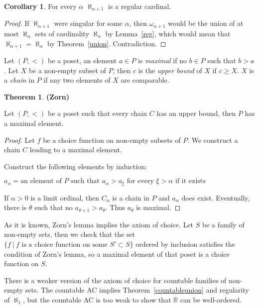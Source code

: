 \documentclass[8pt]{article}
\theoremstyle{definition}
\theoremstyle{definition}
\newtheorem{theorem}{Theorem}[section]
\theoremstyle{definition}
\theoremstyle{definition}
\theoremstyle{definition}
\theoremstyle{definition}
\theoremstyle{definition}
\theoremstyle{definition}
\theoremstyle{definition}
\theoremstyle{definition}
\theoremstyle{definition}
\theoremstyle{definition}
\theoremstyle{definition}
\theoremstyle{definition}
\newtheorem{col}{Corollary}[section]
\theoremstyle{question}
\begin{document}
\begin{col}
  For every $\alpha$ $\aleph_{\alpha + 1}$ is a regular cardinal.
\end{col}

\begin{proof}
  If $\aleph_{\alpha + 1}$ were singular for some $\alpha$, then 
  $\omega_{\alpha + 1}$ would be the union of at most $\aleph_{\alpha}$ 
  sets of cardinality $\aleph_{\alpha}$ by Lemma~\ref{reg}, which
  would mean that $\aleph_{\alpha + 1} = \aleph_{\alpha}$ by Theorem~\ref{union}.
  Contradiction.
\end{proof}

Let $(P, <)$ be a poset, an element $a \in P$ is \emph{maximal} if no $b \in P$ such that $b > a$.
Let $X$ be a non-empty subset of $P$, then $c$ is the \emph{upper bound} of $X$ if $c \geq X$. 
$X$ is a \emph{chain} in $P$ if any two elements of $X$ are comparable.

\begin{theorem} {\bf (Zorn)}

  Let $(P, <)$ be a poset such that every chain $C$ has an upper bound, then $P$ has a maximal element.
\end{theorem}

\begin{proof}
  Let $f$ be a choice function on non-empty subsets of $P$. We construct a chain $C$ leading to a maximal element.

  Construct the following elements by induction:
  \begin{center}
    $a_{\alpha} = \text{an element of $P$ such that $a_{\alpha} > a_{\xi}$ for every $\xi > \alpha$ if it exists}$
  \end{center}

  If $\alpha > 0$ is a limit ordinal, then $C_{\alpha}$ is a chain in $P$ and $a_{\alpha}$ does exist.
  Eventually, there is $\theta$ such that no $a_{\theta+1} > a_{\theta}$. Thus $a_{\theta}$ is maximal.
\end{proof}

As it is known, Zorn's lemma implies the axiom of choice.
Let $S$ be a family of non-empty sets, then we check that the set
$\{ f \: | \: \text{$f$ is a choice function on some $S' \subset S$}\}$ ordered by inclusion
satisfies the condition of Zorn's lemma, so a maximal element of that poset is a choice function on $S$.


There is a weaker version of the axiom of choice for countable families of non-empty sets. 
The countable AC implies Theorem~\ref{countableunion} and regularity of $\aleph_1$, but the
countable AC is too weak to show that $\mathbb{R}$ can be well-ordered.
\end{document}
